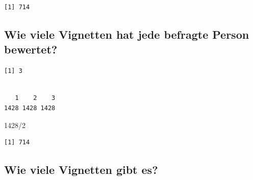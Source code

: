 \documentclass[
  letterpaper,
  DIV=11,
  numbers=noendperiod]{scrartcl}
\newenvironment{Shaded}{\begin{snugshade}}{\end{snugshade}}
\newcommand{\DecValTok}[1]{\textcolor[rgb]{0.68,0.00,0.00}{#1}}
\newcommand{\FunctionTok}[1]{\textcolor[rgb]{0.28,0.35,0.67}{#1}}
\newcommand{\NormalTok}[1]{\textcolor[rgb]{0.00,0.23,0.31}{#1}}
\newcommand{\SpecialCharTok}[1]{\textcolor[rgb]{0.37,0.37,0.37}{#1}}
\begin{document}
\begin{Shaded}
\end{Shaded}

\begin{verbatim}
[1] 714
\end{verbatim}

\subsection{Wie viele Vignetten hat jede befragte Person
bewertet?}\label{wie-viele-vignetten-hat-jede-befragte-person-bewertet}

\begin{Shaded}
\end{Shaded}

\begin{verbatim}
[1] 3
\end{verbatim}

\begin{Shaded}
\end{Shaded}

\begin{verbatim}

   1    2    3 
1428 1428 1428 
\end{verbatim}

\begin{Shaded}
\begin{Highlighting}[]
\DecValTok{1428}\SpecialCharTok{/}\DecValTok{2}
\end{Highlighting}
\end{Shaded}

\begin{verbatim}
[1] 714
\end{verbatim}

\subsection{Wie viele Vignetten gibt
es?}\label{wie-viele-vignetten-gibt-es}
\end{document}

